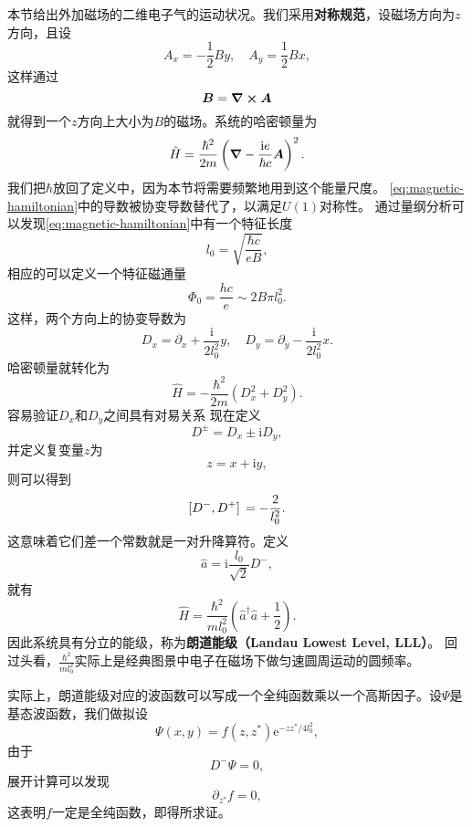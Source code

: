 \documentclass[UTF8, a4paper]{ctexart}
\newcommand*{\ee}{\mathrm{e}}
\newcommand*{\ii}{\mathrm{i}}
\begin{document}
本节给出外加磁场的二维电子气的运动状况。我们采用\textbf{对称规范}，设磁场方向为$z$方向，且设
\begin{equation}
    A_x = - \frac{1}{2} B y, \quad A_y = \frac{1}{2} B x,
\end{equation}
这样通过
\[
    \vb*{B} = \curl{\vb*{A}}
\]
就得到一个$z$方向上大小为$B$的磁场。系统的哈密顿量为
\begin{equation}
    \hat{H} = \frac{\hbar^2}{2m} \left( \grad - \frac{\ii e}{\hbar c} \vb*{A} \right)^2.
    \label{eq:magnetic-hamiltonian}
\end{equation}
我们把$\hbar$放回了定义中，因为本节将需要频繁地用到这个能量尺度。
\eqref{eq:magnetic-hamiltonian}中的导数被协变导数替代了，以满足$U(1)$对称性。
通过量纲分析可以发现\eqref{eq:magnetic-hamiltonian}中有一个特征长度
\begin{equation}
    l_0 = \sqrt{\frac{\hbar c}{e B}},
\end{equation}
相应的可以定义一个特征磁通量
\begin{equation}
    \Phi_0 = \frac{h c}{e} \sim 2 B \pi l_0^2.
\end{equation}
这样，两个方向上的协变导数为
\begin{equation}
    D_x = \partial_x + \frac{\ii}{2l_0^2} y, \quad D_y = \partial_y - \frac{\ii}{2l_0^2}x.
\end{equation}
哈密顿量就转化为
\[
    \hat{H} = - \frac{\hbar^2}{2m} (D_x^2 + D_y^2).
\]
容易验证$D_x$和$D_y$之间具有对易关系
现在定义
\begin{equation}
    D^\pm = D_x \pm \ii D_y,
\end{equation}
并定义复变量$z$为
\begin{equation}
    z = x + \ii y,
\end{equation}
则可以得到
\begin{equation}
    \comm*{D^-}{D^+} = - \frac{2}{l_0^2}.
\end{equation}
这意味着它们差一个常数就是一对升降算符。定义
\begin{equation}
    \hat{a} = \ii \frac{l_0}{\sqrt{2}} D^-,
\end{equation}
就有
\begin{equation}
    \hat{H} = \frac{\hbar^2}{m l_0^2} \left(\hat{a}^\dagger \hat{a} + \frac{1}{2} \right).
\end{equation}
因此系统具有分立的能级，称为\textbf{朗道能级（Landau Lowest Level, LLL）}。
回过头看，$\frac{\hbar^2}{m l_0^2}$实际上是经典图景中电子在磁场下做匀速圆周运动的圆频率。

实际上，朗道能级对应的波函数可以写成一个全纯函数乘以一个高斯因子。设$\Psi$是基态波函数，我们做拟设
\[
    \Psi(x, y) = f(z, z^*) \ee^{- z z^* / 4l_0^2},
\]
由于
\[
    D^- \Psi = 0,
\]
展开计算可以发现
\[
    \partial_{z^*} f = 0,
\]
这表明$f$一定是全纯函数，即得所求证。
\end{document}

